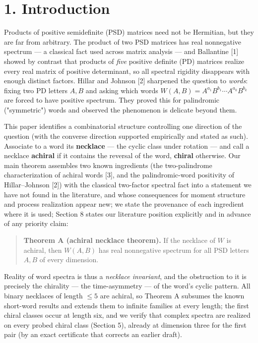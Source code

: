 \documentclass[11pt]{article}
\begin{document}
\section*{1. Introduction}
Products of positive semidefinite (PSD) matrices need not be Hermitian, but they are far from arbitrary.  The product of two PSD matrices has real nonnegative spectrum — a classical fact used across matrix analysis — and Ballantine [1] showed by contrast that products of \emph{five} positive definite (PD) matrices realize every real matrix of positive determinant, so all spectral rigidity disappears with enough distinct factors.  Hillar and Johnson [2] sharpened the question to \emph{words}: fixing two PD letters $A, B$ and asking which words $W(A,B) = A^{a_1}B^{b_1}\cdots A^{a_k}B^{b_k}$ are forced to have positive spectrum.  They proved this for palindromic ("symmetric") words and observed the phenomenon is delicate beyond them.

This paper identifies a combinatorial structure controlling one direction of the question (with the converse direction supported empirically and stated as such).  Associate to a word its \textbf{necklace} — the cyclic class under rotation — and call a necklace \textbf{achiral} if it contains the reversal of the word, \textbf{chiral} otherwise.  Our main theorem assembles two known ingredients (the two-palindrome characterization of achiral words [3], and the palindromic-word positivity of Hillar–Johnson [2]) with the classical two-factor spectral fact into a statement we have not found in the literature, and whose consequences for moment structure and process realization appear new; we state the provenance of each ingredient where it is used; Section 8 states our literature position explicitly and in advance of any priority claim:

\begin{quote}
\textbf{Theorem A (achiral necklace theorem).}  If the necklace of $W$ is achiral, then $W(A,B)$ has real nonnegative spectrum for all PSD letters $A, B$ of every dimension.
\end{quote}
Reality of word spectra is thus a \emph{necklace invariant}, and the obstruction to it is precisely the chirality — the time-asymmetry — of the word's cyclic pattern.  All binary necklaces of length $\le 5$ are achiral, so Theorem A subsumes the known short-word results and extends them to infinite families at every length; the first chiral classes occur at length six, and we verify that complex spectra are realized on every probed chiral class (Section 5), already at dimension three for the first pair (by an exact certificate that corrects an earlier draft).
\end{document}
